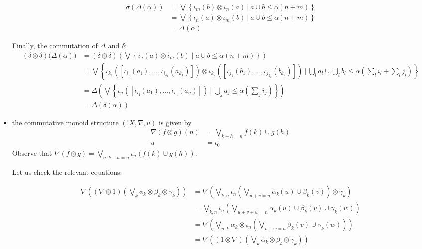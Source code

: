 \begin{itemize}
\begin{align*}
\sigma(\Delta(\alpha)) & = 
\bigvee\left \{\iota_{m}(b)\otimes \iota_{n}(a)\ \Big \vert \ a\cup b \leq \alpha(n+m)\right\}
\\
& = 
\bigvee\left \{\iota_{n}(a)\otimes \iota_{m}(b)\ \Big \vert \ a\cup b \leq \alpha(n+m)\right\}
\\&= \Delta(\alpha)
\end{align*}

Finally, the commutation of $\Delta$ and $\delta$:
{\tiny
\begin{align*}
(\delta\otimes \delta)\Big(\Delta(\alpha)\Big) & =
(\delta\otimes\delta)\left(\bigvee
\left\{
\iota_{n}(a)\otimes \iota_{m}(b) \mid a\cup b \leq \alpha(n+m)
\right\}\right)\\
&=
\bigvee
\left \{\iota_{k_{1}}(
[\iota_{i_{1}}(a_{1}),\dots, \iota_{i_{k_{1}}}(a_{k_{1}})])\otimes
\iota_{k_{2}}(
[\iota_{j_{1}}(b_{1}),\dots, \iota_{j_{k_{2}}}(b_{k_{2}})]) \ \Bigg \vert \
\bigcup_{l}a_{l} \cup \bigcup_{l}b_{l} \leq \alpha\left (\sum_{l}i_{l}+\sum_{l}j_{l}\right)
\right\}
\\
&=
\Delta
\left(\bigvee\left \{
\iota_{n}(
[\iota_{i_{1}}(a_{1}),\dots, \iota_{i_{n}}(a_{n})]) \ \Bigg \vert \ 
\bigcup_{j}a_{j}\leq \alpha(\sum_{j}i_{j})
\right\}\right)
\\
& = \Delta(\delta(\alpha))
\end{align*}
}

\item the commutative monoid structure $(!X,\nabla,u)$ is given by 
\begin{align*}
\nabla( f \otimes g) (n)& = \bigvee_{k+h=n}f(k)\cup g(h) \\ 
u & =  \iota_{0}
\end{align*}
Observe that $\nabla(f\otimes g)=\bigvee_{n,k+h=n}\iota_{n}(f(k)\cup g(h))$.

Let us check the relevant equations:


\begin{align*}
\nabla\left((\nabla\otimes 1)\left(\bigvee_{k}\alpha_{k}\otimes \beta_{k}\otimes \gamma_{k}\right)\right) & =
\nabla \left(
\bigvee_{k,n}
\iota_{n}\left( \bigvee_{u+v=n}\alpha_{k}(u)\cup \beta_{k}(v)
\right)
\otimes \gamma_{k}
\right)\\
&=
\bigvee_{k,n}\iota_{n}\left( \bigvee_{u+v+w=n}
\alpha_{k}(u)\cup \beta_{k}(v)\cup \gamma_{k}(w)\right) \\
& =
\nabla \left(
\bigvee_{n,k}\alpha_{k}\otimes 
\iota_{n}\left( \bigvee_{v+w=n}\beta_{k}(v)\cup \gamma_{k}(w)\right)
\right)\\
&= 
\nabla\left((1\otimes\nabla)\left(\bigvee_{k}\alpha_{k}\otimes \beta_{k}\otimes \gamma_{k}\right)\right) 
\end{align*}



\end{itemize}
